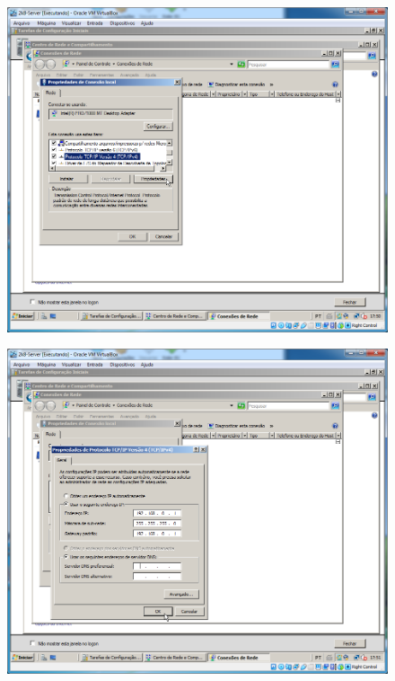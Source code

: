 \documentclass[10pt]{article}
\begin{document}
\begin{figure}[H]
    \centering
    \caption{}
    \label{fig:4244}
    \includegraphics[width=\linewidth]{images/configuracao_windows/windows_server/033.png}
\end{figure}
\begin{figure}[H]
    \centering
    \caption{}
    \label{fig:4245}
    \includegraphics[width=\linewidth]{images/configuracao_windows/windows_server/034.png}
\end{figure}
\end{document}
